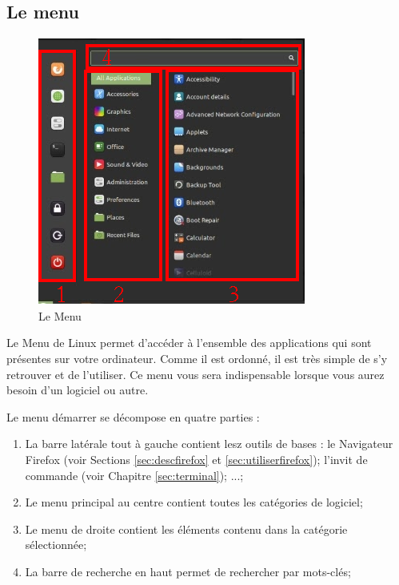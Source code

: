 \documentclass[12pt]{book}
\begin{document}
	\subsection{Le menu}\label{sec:menu}
		\begin{figure}[h]
			\centering
			\includegraphics[width=.4\textwidth]{include/menu.png}\newline
			\caption{Le Menu}
			\label{fig:menu}
		\end{figure}\par
		Le Menu de Linux permet d'accéder à l'ensemble des applications qui sont présentes sur votre ordinateur.
		Comme il est ordonné, il est très simple de s'y retrouver et de l'utiliser.
		Ce menu vous sera indispensable lorsque vous aurez besoin d'un logiciel ou autre.\par
		Le menu démarrer se décompose en quatre parties :
		\begin{enumerate}
			\item La barre latérale tout à gauche contient lesz outils de bases : le Navigateur Firefox (voir Sections \ref{sec:descfirefox} et \ref{sec:utiliserfirefox}); l'invit de commande (voir Chapitre \ref{sec:terminal}); ...;
			\item Le menu principal au centre contient toutes les catégories de logiciel;
			\item Le menu de droite contient les éléments contenu dans la catégorie sélectionnée;
			\item La barre de recherche en haut permet de rechercher par mots-clés;
		\end{enumerate}
\end{document}
